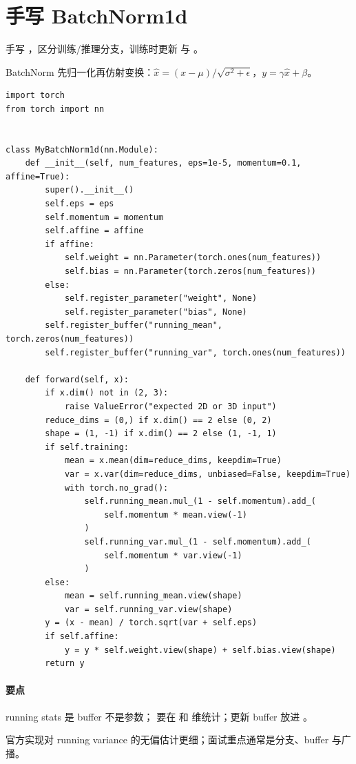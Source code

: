 \section{手写 BatchNorm1d}
\begin{interview}
手写 ，区分训练/推理分支，训练时更新  与 。
\end{interview}
\begin{answer}
BatchNorm 先归一化再仿射变换：$\hat{x}=(x-\mu)/\sqrt{\sigma^2+\epsilon}$，$y=\gamma\hat{x}+\beta$。
\begin{lstlisting}
import torch
from torch import nn


class MyBatchNorm1d(nn.Module):
    def __init__(self, num_features, eps=1e-5, momentum=0.1, affine=True):
        super().__init__()
        self.eps = eps
        self.momentum = momentum
        self.affine = affine
        if affine:
            self.weight = nn.Parameter(torch.ones(num_features))
            self.bias = nn.Parameter(torch.zeros(num_features))
        else:
            self.register_parameter("weight", None)
            self.register_parameter("bias", None)
        self.register_buffer("running_mean", torch.zeros(num_features))
        self.register_buffer("running_var", torch.ones(num_features))

    def forward(self, x):
        if x.dim() not in (2, 3):
            raise ValueError("expected 2D or 3D input")
        reduce_dims = (0,) if x.dim() == 2 else (0, 2)
        shape = (1, -1) if x.dim() == 2 else (1, -1, 1)
        if self.training:
            mean = x.mean(dim=reduce_dims, keepdim=True)
            var = x.var(dim=reduce_dims, unbiased=False, keepdim=True)
            with torch.no_grad():
                self.running_mean.mul_(1 - self.momentum).add_(
                    self.momentum * mean.view(-1)
                )
                self.running_var.mul_(1 - self.momentum).add_(
                    self.momentum * var.view(-1)
                )
        else:
            mean = self.running_mean.view(shape)
            var = self.running_var.view(shape)
        y = (x - mean) / torch.sqrt(var + self.eps)
        if self.affine:
            y = y * self.weight.view(shape) + self.bias.view(shape)
        return y
\end{lstlisting}
\paragraph{要点} running stats 是 buffer 不是参数； 要在  和  维统计；更新 buffer 放进 。
\end{answer}
\begin{trap}
官方实现对 running variance 的无偏估计更细；面试重点通常是分支、buffer 与广播。
\end{trap}

